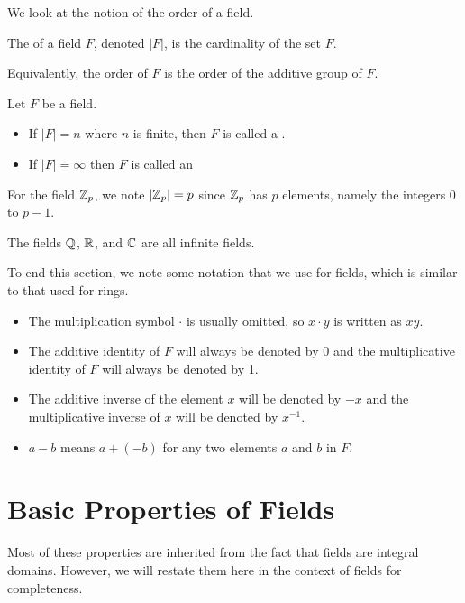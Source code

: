 We look at the notion of the order of a field.
\begin{definition}
    The  of a field $F$, denoted $|F|$, is the cardinality of the set $F$.
\end{definition}
\begin{remark}
    Equivalently, the order of $F$ is the order of the additive group of $F$.
\end{remark}

\begin{definition}
    Let $F$ be a field.
    \begin{itemize}
        \item If $|F| = n$ where $n$ is finite, then $F$ is called a .
        \item If $|F| = \infty$ then $F$ is called an 
    \end{itemize}
\end{definition}

\begin{example}
    For the field $\mathbb{Z}_p$, we note $|\mathbb{Z}_p| = p$ since $\mathbb{Z}_p$ has $p$ elements, namely the integers 0 to $p - 1$.
\end{example}
\begin{example}
    The fields $\mathbb{Q}$, $\mathbb{R}$, and $\mathbb{C}$ are all infinite fields.
\end{example}

To end this section, we note some notation that we use for fields, which is similar to that used for rings.
\begin{itemize}
    \item The multiplication symbol $\cdot$ is usually omitted, so $x \cdot y$ is written as $xy$.
    \item The additive identity of $F$ will always be denoted by 0 and the multiplicative identity of $F$ will always be denoted by 1.
    \item The additive inverse of the element $x$ will be denoted by $-x$ and the multiplicative inverse of $x$ will be denoted by $x^{-1}$.
    \item $a - b$ means $a + (-b)$ for any two elements $a$ and $b$ in $F$.
\end{itemize}

\newpage

\section{Basic Properties of Fields}
Most of these properties are inherited from the fact that fields are integral domains. However, we will restate them here in the context of fields for completeness.

